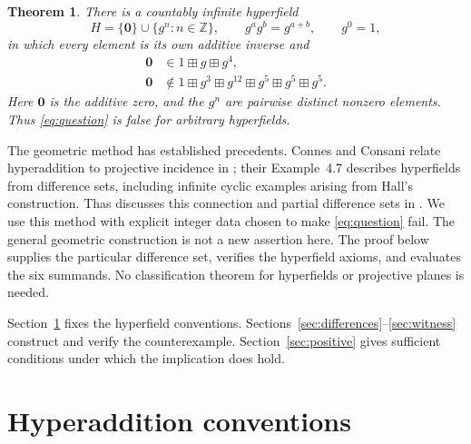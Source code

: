 \documentclass[11pt]{article}
\newtheorem{theorem}{Theorem}[section]
\theoremstyle{remark}
\newcommand{\Z}{\mathbb Z}
\newcommand{\hz}{\mathbf 0}
\newcommand{\hs}{\boxplus}
\begin{document}
\begin{theorem}\label{thm:main}
There is a countably infinite hyperfield
\[
 H=\{\hz\}\cup\{g^n:n\in\Z\},\qquad
 g^ag^b=g^{a+b},\qquad g^0=1,
\]
in which every element is its own additive inverse and
\begin{align}
 \hz&\in 1\hs g\hs g^4,\label{eq:witness-premise}\\
 \hz&\notin 1\hs g^3\hs g^{12}\hs g^5\hs g^5\hs g^5.
 \label{eq:witness-failure}
\end{align}
Here $\hz$ is the additive zero, and the $g^n$ are pairwise distinct
nonzero elements. Thus \eqref{eq:question} is false for arbitrary
hyperfields.
\end{theorem}

The geometric method has established precedents. Connes and Consani
relate hyperaddition to projective incidence in
\cite[Proposition~3.1 and Lemma~3.5]{CC}; their
Example~4.7 describes hyperfields from difference sets, including
infinite cyclic examples arising from Hall's construction.
Thas discusses this connection and partial difference sets in
\cite[Sections~2.2--2.3 and 4.1]{Thas}.
We use this method with explicit integer data chosen to make
\eqref{eq:question} fail. The general geometric construction is not a
new assertion here. The proof below supplies the particular difference
set, verifies the hyperfield axioms, and evaluates the six summands.
No classification theorem for hyperfields or projective planes is needed.

Section~\ref{sec:conventions} fixes the hyperfield conventions.
Sections~\ref{sec:differences}--\ref{sec:witness} construct and verify the
counterexample. Section~\ref{sec:positive} gives sufficient conditions
under which the implication does hold.

\section{Hyperaddition conventions}\label{sec:conventions}
\end{document}
